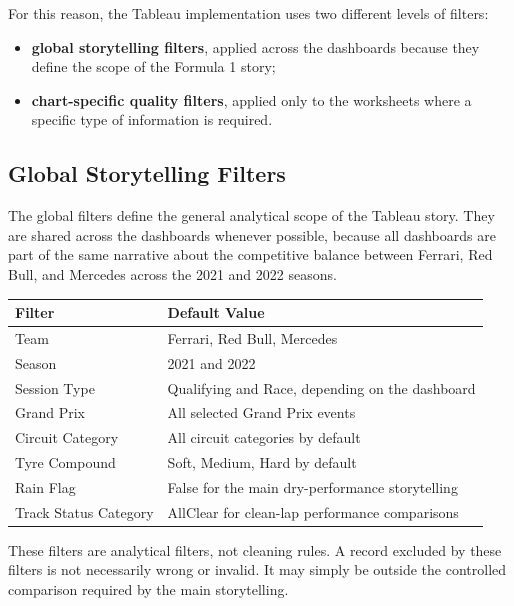 \documentclass[12pt,a4paper]{article}
\begin{document}
	For this reason, the Tableau implementation uses two different levels of filters:
	
	\begin{itemize}[leftmargin=1.2cm]
		\item \textbf{global storytelling filters}, applied across the dashboards because they define the scope of the Formula 1 story;
		\item \textbf{chart-specific quality filters}, applied only to the worksheets where a specific type of information is required.
	\end{itemize}
	
	\subsection{Global Storytelling Filters}
	
	The global filters define the general analytical scope of the Tableau story.
	They are shared across the dashboards whenever possible, because all dashboards are part of the same narrative about the competitive balance between Ferrari, Red Bull, and Mercedes across the 2021 and 2022 seasons.
	
	\begin{longtable}{p{5cm} p{9cm}}
		\toprule
		\textbf{Filter} & \textbf{Default Value} \\
		\midrule
		Team & Ferrari, Red Bull, Mercedes \\
		Season & 2021 and 2022 \\
		Session Type & Qualifying and Race, depending on the dashboard \\
		Grand Prix & All selected Grand Prix events \\
		Circuit Category & All circuit categories by default \\
		Tyre Compound & Soft, Medium, Hard by default \\
		Rain Flag & False for the main dry-performance storytelling \\
		Track Status Category & AllClear for clean-lap performance comparisons \\
		\bottomrule
	\end{longtable}
	
	These filters are analytical filters, not cleaning rules.
	A record excluded by these filters is not necessarily wrong or invalid.
	It may simply be outside the controlled comparison required by the main storytelling.
	
\end{document}
